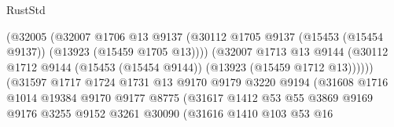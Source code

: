 \begin{lexlean}{RustStd}
\begin{coremodule}
                                        (@32005
                                          (@32007
                                            @1706
                                            @13
                                            @9137
                                            (@30112
                                              @1705
                                              @9137
                                              (@15453 (@15454 @9137))
                                              (@13923 (@15459 @1705 @13))))
                                          (@32007
                                            @1713
                                            @13
                                            @9144
                                            (@30112
                                              @1712
                                              @9144
                                              (@15453 (@15454 @9144))
                                              (@13923 (@15459 @1712 @13))))))
                                      (@31597
                                        @1717
                                        @1724
                                        @1731
                                        @13
                                        @9170
                                        @9179
                                        @3220
                                        @9194
                                        (@31608
                                          @1716
                                          @1014
                                          @19384
                                          @9170
                                          @9177
                                          @8775
                                          (@31617
                                            @1412
                                            @53
                                            @55
                                            @3869
                                            @9169
                                            @9176
                                            @3255
                                            @9152
                                            @3261
                                            @30090
                                            (@31616
                                              @1410
                                              @103
                                              @53
                                              @16

\end{coremodule}
\end{lexlean}

